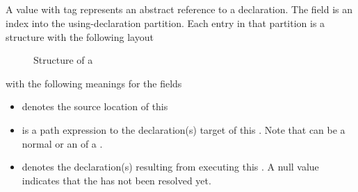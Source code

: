 

\subsection{}
\label{sec:ifc:DirSort:DeclUse}

A  value with tag  represents an abstract reference to a  declaration.
The  field is an index into the using-declaration partition.
Each entry in that partition is a structure with the following layout
%
\begin{figure}[H]
    \centering
    \caption{Structure of a }
    \label{fig:ifc:DirSort:DeclUse}
\end{figure}
%
with the following meanings for the fields
\begin{itemize}
    \item {} denotes the source location of this 
    \item {} is a path expression to the declaration(s) target of this .  Note that  can be a normal  or an  of a .
    \item {} denotes the declaration(s) resulting from executing this .  A null value indicates that the  has not been resolved yet.
\end{itemize}



\subsection{}
\label{sec:ifc:DirSort:Expr}

